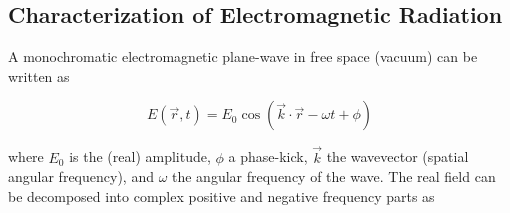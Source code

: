 

\subsection{Characterization of Electromagnetic Radiation}
\label{subsec:em_radiation_characterization}

\noindent 
A monochromatic electromagnetic plane-wave in free space (vacuum) can be written as

\begin{equation}
	E(\vec{r},t) = E_0 \cos(\vec{k} \cdot \vec{r} - \omega t + \phi)
	\label{eq:plane_wave}
\end{equation}

\noindent 
where $E_0$ is the (real) amplitude, $\phi$ a phase-kick, $\vec{k}$ the wavevector (spatial angular frequency), and $\omega$ the angular frequency of the wave. The real field can be decomposed into complex positive and negative frequency parts as

\iffalse
\begin{equation}
	E^{(+)} = E_0 e^{i(\vec{k} \cdot \vec{r} - \omega t + \phi)}
	\label{eq:positive_frequency_e_field}
\end{equation}

\noindent 
with $E^{(-)} = E^{(+)}^{*}$ and thus $E = 1/2 \{E^{(+)} + E^{(-)}\}$.
$E^{(+)}$ is called the positive-frequency part because in Fourier space it contains only components with frequencies $\omega > 0$ \todoref{fact check}. This will come in handy applying a rotating wave approximation as the positive field part rotates in the same direction as the rotating frame and the negative rotates in the opposite direction \cite{hamm2005principlesnonlinearoptical}.
\fi





